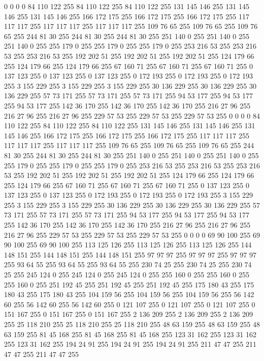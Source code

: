 0 0 0 0 84 110 122 255 84 110 122 255 84 110 122 255 131 145 146 255 131 145 146 255 131 145 146 255 166 172 175 255 166 172 175 255 166 172 175 255 117 117 117 255 117 117 117 255 117 117 117 255 109 76 65 255 109 76 65 255 109 76 65 255
244 81 30 255 244 81 30 255 244 81 30 255 251 140 0 255 251 140 0 255 251 140 0 255 255 179 0 255 255 179 0 255 255 179 0 255 253 216 53 255 253 216 53 255 253 216 53 255 192 202 51 255 192 202 51 255 192 202 51 255 124 179 66 255
124 179 66 255 124 179 66 255 67 160 71 255 67 160 71 255 67 160 71 255 0 137 123 255 0 137 123 255 0 137 123 255 0 172 193 255 0 172 193 255 0 172 193 255 3 155 229 255 3 155 229 255 3 155 229 255 30 136 229 255 30 136 229 255
30 136 229 255 57 73 171 255 57 73 171 255 57 73 171 255 94 53 177 255 94 53 177 255 94 53 177 255 142 36 170 255 142 36 170 255 142 36 170 255 216 27 96 255 216 27 96 255 216 27 96 255 229 57 53 255 229 57 53 255 229 57 53 255
0 0 0 0 84 110 122 255 84 110 122 255 84 110 122 255 131 145 146 255 131 145 146 255 131 145 146 255 166 172 175 255 166 172 175 255 166 172 175 255 117 117 117 255 117 117 117 255 117 117 117 255 109 76 65 255 109 76 65 255 109 76 65 255
244 81 30 255 244 81 30 255 244 81 30 255 251 140 0 255 251 140 0 255 251 140 0 255 255 179 0 255 255 179 0 255 255 179 0 255 253 216 53 255 253 216 53 255 253 216 53 255 192 202 51 255 192 202 51 255 192 202 51 255 124 179 66 255
124 179 66 255 124 179 66 255 67 160 71 255 67 160 71 255 67 160 71 255 0 137 123 255 0 137 123 255 0 137 123 255 0 172 193 255 0 172 193 255 0 172 193 255 3 155 229 255 3 155 229 255 3 155 229 255 30 136 229 255 30 136 229 255
30 136 229 255 57 73 171 255 57 73 171 255 57 73 171 255 94 53 177 255 94 53 177 255 94 53 177 255 142 36 170 255 142 36 170 255 142 36 170 255 216 27 96 255 216 27 96 255 216 27 96 255 229 57 53 255 229 57 53 255 229 57 53 255
0 0 0 0 69 90 100 255 69 90 100 255 69 90 100 255 113 125 126 255 113 125 126 255 113 125 126 255 144 148 151 255 144 148 151 255 144 148 151 255 97 97 97 255 97 97 97 255 97 97 97 255 93 64 55 255 93 64 55 255 93 64 55 255
230 74 25 255 230 74 25 255 230 74 25 255 245 124 0 255 245 124 0 255 245 124 0 255 255 160 0 255 255 160 0 255 255 160 0 255 251 192 45 255 251 192 45 255 251 192 45 255 175 180 43 255 175 180 43 255 175 180 43 255 104 159 56 255
104 159 56 255 104 159 56 255 56 142 60 255 56 142 60 255 56 142 60 255 0 121 107 255 0 121 107 255 0 121 107 255 0 151 167 255 0 151 167 255 0 151 167 255 2 136 209 255 2 136 209 255 2 136 209 255 25 118 210 255 25 118 210 255
25 118 210 255 48 63 159 255 48 63 159 255 48 63 159 255 81 45 168 255 81 45 168 255 81 45 168 255 123 31 162 255 123 31 162 255 123 31 162 255 194 24 91 255 194 24 91 255 194 24 91 255 211 47 47 255 211 47 47 255 211 47 47 255
